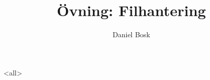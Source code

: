 \documentclass[ignoreframetext]{beamer}
\begin{document}
\title{%
  Övning: Filhantering
}
\author{Daniel Bosk}

\begin{frame}
  \maketitle
\end{frame}

\mode<all>

\mode*
%
\end{document}
